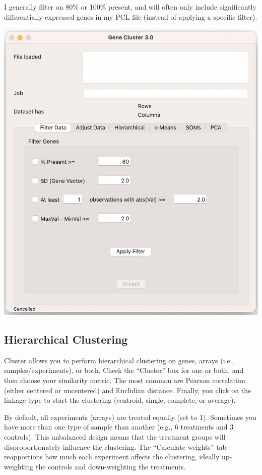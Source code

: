 \documentclass[
]{book}
\begin{document}
I generally filter on 80\% or 100\% present, and will often only include significantly differentially expressed genes in my PCL file (instead of applying a specific filter).

\includegraphics[width=16.81in]{figures/Filter_Data}

\hypertarget{hierarchical-clustering}{%
\subsection{Hierarchical Clustering}\label{hierarchical-clustering}}

Cluster allows you to perform hierarchical clustering on genes, arrays (i.e., samples/experiments), or both. Check the ``Cluster'' box for one or both, and then choose your similarity metric. The most common are Pearson correlation (either centered or uncentered) and Euclidian distance. Finally, you click on the linkage type to start the clustering (centroid, single, complete, or average).

By default, all experiments (arrays) are treated equally (set to 1). Sometimes you have more than one type of sample than another (e.g., 6 treatments and 3 controls). This unbalanced design means that the treatment groups will disproportionately influence the clustering. The ``Calculate weights'' tab reapportions how much each experiment affects the clustering, ideally up-weighting the controls and down-weighting the treatments.
\end{document}
